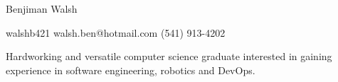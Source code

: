 \documentclass[12pt,letterpaper]{article}
\begin{document}
	\centering
	{\huge
		Benjiman Walsh
	}

	\vspace{0.75cm}
    
    \hspace{1.75cm}
    \raggedright
    \faGithub 
	\hspace{0.15cm}
	walshb421
	\hspace{0.75cm}
	\faEnvelope
	\hspace{0.15cm}
	walsh.ben@hotmail.com	
	\hspace{0.75cm}
	\faPhone
	\hspace{0.15cm}
	(541) 913-4202
	
	\noindent\makebox[\linewidth]{\rule{\linewidth}{0.4pt}}
	
	
	\raggedright
	\hspace{0.5cm}
	
	Hardworking and versatile computer science graduate interested in gaining experience in software engineering, robotics and DevOps.
	
\end{document}
